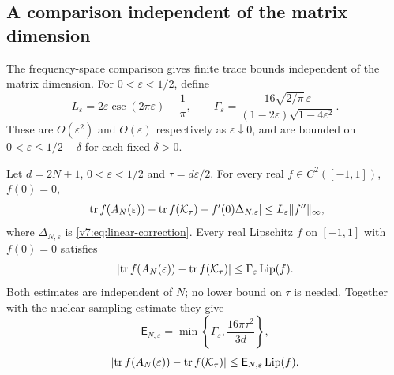 \subsection{A comparison independent of the matrix dimension}
\label{v11:sec:direct-transfer}\label{v10:sec:finite-lipschitz}
The frequency-space comparison gives finite trace bounds independent of
the matrix dimension. For $0<\varepsilon<1/2$, define
\begin{equation}\label{v11:eq:transfer-constants}
 L_\varepsilon=2\varepsilon\csc(2\pi\varepsilon)-\frac1\pi,
 \qquad
 \Gamma_\varepsilon=
 \frac{16\sqrt{2/\pi}\,\varepsilon}
 {(1-2\varepsilon)\sqrt{1-4\varepsilon^2}}.
\end{equation}
These are $O(\varepsilon^2)$ and $O(\varepsilon)$ respectively as
$\varepsilon\downarrow0$, and are bounded on
$0<\varepsilon\le1/2-\delta$ for each fixed $\delta>0$.

\begin{theorem}\label{v11:thm:direct-transfer}
\label{v10:thm:finite-lipschitz}
Let $d=2N+1$, $0<\varepsilon<1/2$ and $\tau=d\varepsilon/2$.
For every real $f\in C^2([-1,1])$, $f(0)=0$,
\begin{equation}\label{v11:eq:direct-smooth}
 \left|\operatorname{tr} f(A_N(\varepsilon))-\operatorname{tr} f(\mathcal K_\tau)
                 -f'(0)\Delta_{N,\varepsilon}\right|
 \le L_\varepsilon\|f''\|_\infty,
\end{equation}
where $\Delta_{N,\varepsilon}$ is \eqref{v7:eq:linear-correction}.
Every real Lipschitz $f$ on $[-1,1]$ with $f(0)=0$ satisfies
\begin{equation}\label{v11:eq:direct-lipschitz}
 \left|\operatorname{tr} f(A_N(\varepsilon))-\operatorname{tr} f(\mathcal K_\tau)\right|
 \le\Gamma_\varepsilon\operatorname{Lip}(f).
\end{equation}
Both estimates are independent of $N$; no lower bound on $\tau$ is needed.
Together with the nuclear sampling estimate they give
\begin{equation}\label{v10:eq:finite-lip-error}
 \mathsf E_{N,\varepsilon}
 =\min\left\{\Gamma_\varepsilon,\frac{16\pi\tau^2}{3d}\right\},
\end{equation}
\begin{equation}\label{v10:eq:finite-lipschitz}
 \left|\operatorname{tr} f(A_N(\varepsilon))-\operatorname{tr} f(\mathcal K_\tau)\right|
 \le\mathsf E_{N,\varepsilon}\operatorname{Lip}(f).
\end{equation}
\end{theorem}

